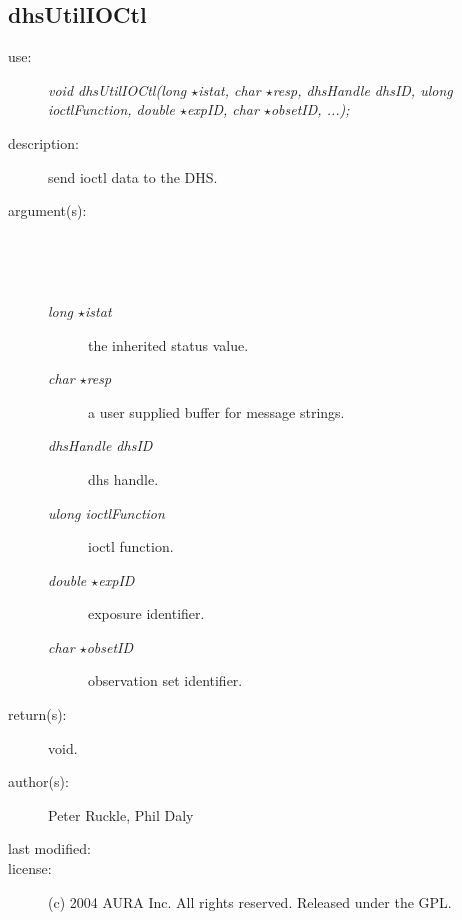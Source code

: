 \subsection {dhsUtilIOCtl} \begin{description} \item[\sc use:] \emph{void dhsUtilIOCtl(long $\star$istat, char $\star$resp, dhsHandle dhsID, ulong ioctlFunction, double $\star$expID, char $\star$obsetID, ...);} \item[\sc description:] send ioctl data to the DHS. \item[\sc argument(s):] \begin{description} \item[\ ] \ \item[\emph{long $\star$istat}] the inherited status value. \item[\emph{char $\star$resp}] a user supplied buffer for message strings. \item[\emph{dhsHandle dhsID}] dhs handle. \item[\emph{ulong ioctlFunction}] ioctl function. \item[\emph{double $\star$expID}] exposure identifier. \item[\emph{char $\star$obsetID}] observation set identifier. \end{description} \item[\sc return(s):] void. \item[\sc author(s):] Peter Ruckle, Phil Daly \item[\sc last modified:] \item[\sc license:] (c) 2004 AURA Inc. All rights reserved. Released under the GPL. \end{description}

